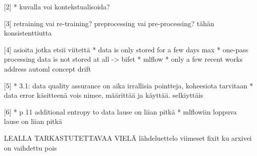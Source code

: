 [2]
* kuvalla voi kontekstualisoida?

[3]
retraining vai re-training?
preprocessing vai pre-processing? tähän konsistenttiutta

[4] asioita jotka etsii viitettä
* data is only stored for a few days max
* one-pass processing data is not stored at all -> bifet
* mlflow
* only a few recent works address automl concept drift

[5]
* 3.1: data quality assurance on aika irrallisia pointteja, koheesiota tarvitaan
* data error käsitteenä vois nimee, määrittää ja käyttää. selkiyttäis

[6]
* p 11 additional entropy to data lause on liian pitkä
* mlflowiin loppuva lause on liian pitkä

LEALLA TARKASTUTETTAVAA VIELÄ
lähdeluettelo viimeset fixit ku arxivei on vaihdettu pois